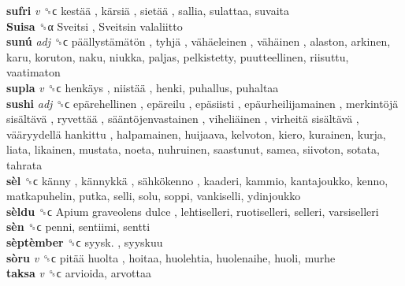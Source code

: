 \textbf{sufri} \emph{v}  ␝ϲ   kestää ,  kärsiä ,  sietää , sallia, sulattaa, suvaita  \\
\textbf{Suisa} ␝α   Sveitsi ,  Sveitsin valaliitto   \\
\textbf{sunú} \emph{adj}  ␝ϲ   päällystämätön ,  tyhjä ,  vähäeleinen ,  vähäinen , alaston, arkinen, karu, koruton, naku, niukka, paljas, pelkistetty, puutteellinen, riisuttu, vaatimaton  \\
\textbf{supla} \emph{v}  ␝ϲ   henkäys ,  niistää , henki, puhallus, puhaltaa  \\
\textbf{sushi} \emph{adj}  ␝ϲ   epärehellinen ,  epäreilu ,  epäsiisti ,  epäurheilijamainen ,  merkintöjä sisältävä ,  ryvettää ,  sääntöjenvastainen ,  viheliäinen ,  virheitä sisältävä ,  vääryydellä hankittu , halpamainen, huijaava, kelvoton, kiero, kurainen, kurja, liata, likainen, mustata, noeta, nuhruinen, saastunut, samea, siivoton, sotata, tahrata  \\
\textbf{sèl} ␝ϲ   känny ,  kännykkä ,  sähkökenno , kaaderi, kammio, kantajoukko, kenno, matkapuhelin, putka, selli, solu, soppi, vankiselli, ydinjoukko  \\
\textbf{sèldu} ␝ϲ   Apium graveolens dulce , lehtiselleri, ruotiselleri, selleri, varsiselleri  \\
\textbf{sèn} ␝ϲ  penni, sentiimi, sentti  \\
\textbf{sèptèmber} ␝ϲ   syysk. , syyskuu  \\
\textbf{sòru} \emph{v}  ␝ϲ   pitää huolta , hoitaa, huolehtia, huolenaihe, huoli, murhe  \\
\textbf{taksa} \emph{v}  ␝ϲ  arvioida, arvottaa  \\

